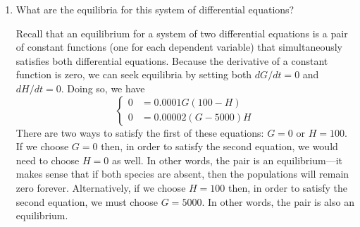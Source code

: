 \documentclass[main]{subfiles}
\begin{document}
\begin{enumerate}
\begin{enumerate}
  \begin{solution}
    Let's evaluate these statements one at a time:
    \begin{enumerate}
    \item False.  In the absence of hyenas, gazelles grow exponentially.
    \item True.  If $H = 0$, then $dG/dt = 0.01G$, implying exponential growth of $G$.      
    \item False.  If $G = 0$, then $H$ decays exponentially.  Apparently, $H$ has no alternative food source.
    \item True.
    \item False.  This would mean that {\em both} species would be penalized by the presence of the other.
          Here, $dG/dt$ is reduced in the presence of $H$, but $dH/dt$ increases as $G$ increases.
    \item True.
    \end{enumerate}
  \end{solution}
  

  \item
  \begin{problem}[1in]
  What are the equilibria for this system of differential equations?
  \end{problem}

  \begin{solution}
    Recall that an equilibrium for a system of two differential equations is a pair
    of constant functions (one for each dependent variable) that simultaneously satisfies
    both differential equations.  Because the derivative of a constant function is zero,
    we can seek equilibria by setting both $dG/dt = 0$ and $dH/dt = 0$.  Doing so, we have
    $$ \left\{
      \begin{aligned}   
      0 & = 0.0001G(100- H) \\
      0 & = 0.00002(G-5000) H
      \end{aligned} \right.
    $$
    There are two ways to satisfy the first of these equations:  $G = 0$ or $H = 100$.
    If we choose $G = 0$ then, in order to satisfy the second equation, we would need to
    choose $H = 0$ as well.  In other words, the pair  is an
    equilibrium---it makes sense that if both species are absent, then the populations
    will remain zero forever.  Alternatively, if we choose $H = 100$ then, in order to
    satisfy the second equation, we must choose $G = 5000$.  In other words, the pair
     is also an equilibrium.    
  \end{solution}



\end{enumerate}
\end{enumerate}
\end{document}
